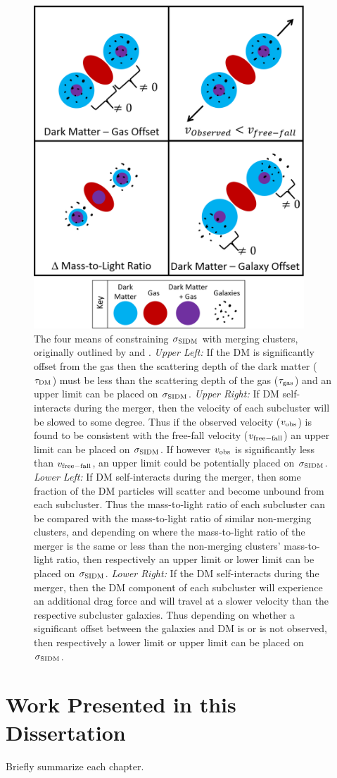 \begin{figure}
\centering
\includegraphics[width=4in]{Chapter1/4ConstraintMethods.png}
\caption{The four means of constraining $\sigma_{\rm SIDM}$ with merging clusters, originally outlined by \citet{Markevitch:2004dl} and \citet{Randall:2008hs}. 
\emph{Upper Left:} If the DM is significantly offset from the gas then the scattering depth of the dark matter ($\tau_{\rm DM}$) must be less than the scattering depth of the gas ($\tau_{\rm gas}$) and an upper limit can be placed on $\sigma_{\rm SIDM}$.
\emph{Upper Right:} If DM self-interacts during the merger, then the velocity of each subcluster will be slowed to some degree.
Thus if the observed velocity ($v_{\rm obs}$) is found to be consistent with the free-fall velocity ($v_{\rm free-fall}$) an upper limit can be placed on $\sigma_{\rm SIDM}$.
If however $v_{\rm obs}$ is significantly less than $v_{\rm free-fall}$, an upper limit could be potentially placed on $\sigma_{\rm SIDM}$.
\emph{Lower Left:} If DM self-interacts during the merger, then some fraction of the DM particles will scatter and become unbound from each subcluster.
Thus the mass-to-light ratio of each subcluster can be compared with the mass-to-light ratio of similar non-merging clusters, and depending on where the mass-to-light ratio of the merger is the same or less than the non-merging clusters' mass-to-light ratio, then respectively an upper limit or lower limit can be placed on $\sigma_{\rm SIDM}$.
\emph{Lower Right:} If the DM self-interacts during the merger, then the DM component of each subcluster will experience an additional drag force and will travel at a slower velocity than the respective subcluster galaxies.
Thus depending on whether a significant offset between the galaxies and DM is or is not observed, then respectively a lower limit or upper limit can be placed on $\sigma_{\rm SIDM}$.
\label{fig:4ConstraintMethods}}
\end{figure}

\section{Work Presented in this Dissertation}
Briefly summarize each chapter.
